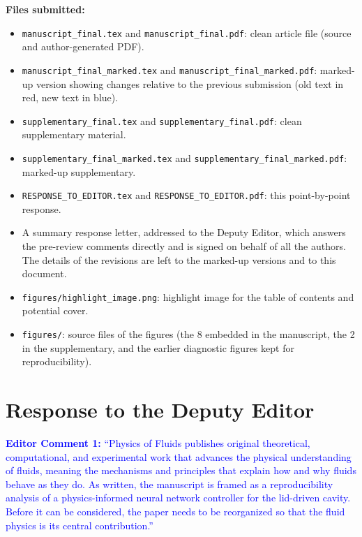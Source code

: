 \documentclass[11pt,a4paper]{article}
\begin{document}
\vspace{1em}
\noindent\textbf{Files submitted:}
\begin{itemize}
\item \texttt{manuscript\_final.tex} and \texttt{manuscript\_final.pdf}: clean
  article file (source and author-generated PDF).
\item \texttt{manuscript\_final\_marked.tex} and
  \texttt{manuscript\_final\_marked.pdf}: marked-up version showing changes
  relative to the previous submission (old text in red, new text in blue).
\item \texttt{supplementary\_final.tex} and \texttt{supplementary\_final.pdf}:
  clean supplementary material.
\item \texttt{supplementary\_final\_marked.tex} and
  \texttt{supplementary\_final\_marked.pdf}: marked-up supplementary.
\item \texttt{RESPONSE\_TO\_EDITOR.tex} and
  \texttt{RESPONSE\_TO\_EDITOR.pdf}: this point-by-point response.
\item A summary response letter, addressed to the Deputy Editor, which answers
  the pre-review comments directly and is signed on behalf of all the authors.
  The details of the revisions are left to the marked-up versions and to this
  document.
\item \texttt{figures/highlight\_image.png}: highlight image for the table of
  contents and potential cover.
\item \texttt{figures/}: source files of the figures (the 8 embedded in the
  manuscript, the 2 in the supplementary, and the earlier diagnostic figures
  kept for reproducibility).
\end{itemize}

\newpage

\section*{Response to the Deputy Editor}

\noindent\textcolor{blue}{\textbf{Editor Comment 1:} ``Physics of Fluids
publishes original theoretical, computational, and experimental work that
advances the physical understanding of fluids, meaning the mechanisms and
principles that explain how and why fluids behave as they do. As written, the
manuscript is framed as a reproducibility analysis of a physics-informed neural
network controller for the lid-driven cavity. Before it can be considered, the
paper needs to be reorganized so that the fluid physics is its central
contribution.''}
\end{document}
